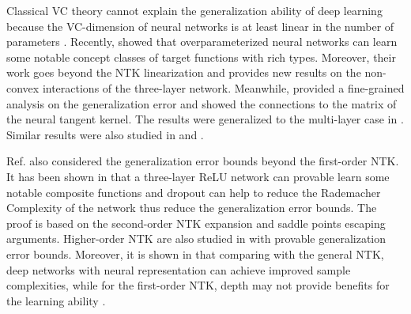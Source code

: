 \documentclass{article}
\newcommand{\cO}{\mathcal{O}}
\begin{document}
Classical VC theory cannot explain the generalization ability of deep learning because the VC-dimension of neural networks is at least linear in the number of parameters \cite{BartlettHLM19}. Recently, \cite{NEURIPS201962dad6e2}  showed that overparameterized neural networks can learn some notable concept classes of target functions with rich types. Moreover, their work goes beyond the NTK linearization and provides new results on  the non-convex
interactions of the three-layer network. Meanwhile, \cite{sa} provided a fine-grained analysis on the generalization error and showed the connections to the matrix of the neural tangent kernel. The results were generalized to the multi-layer case in \cite{cao}. Similar results were also studied in \cite{ji2020polylogarithmic} and \cite{chen2020overparameterization}.

Ref. \cite{NEURIPS201962dad6e2} also considered the generalization error bounds beyond the first-order NTK. It has been shown in \cite{NEURIPS201962dad6e2} that a three-layer ReLU network can provable learn some notable composite functions and dropout can help to reduce  the Rademacher  Complexity of the network thus reduce the generalization error bounds. The proof is based on the second-order NTK expansion and saddle points escaping arguments. Higher-order NTK are also studied in  \cite{Bai2020Beyond} with provable generalization error bounds. Moreover, it is shown in \cite{NEURIPS2020_fb647ca6} that comparing with the general NTK, deep networks with neural representation can achieve improved sample complexities, while for the first-order NTK, depth may not provide benefits for the learning ability \cite{bietti2021deep}.
\end{document}
